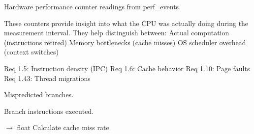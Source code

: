 \documentclass[letterpaper,10pt,english]{sphinxmanual}
\begin{document}
\begin{fulllineitems}
\sphinxAtStartPar
Hardware performance counter readings from perf\_events.

\sphinxAtStartPar
These counters provide insight into what the CPU was actually doing
during the measurement interval. They help distinguish between:
\sphinxhyphen{} Actual computation (instructions retired)
\sphinxhyphen{} Memory bottlenecks (cache misses)
\sphinxhyphen{} OS scheduler overhead (context switches)

\sphinxAtStartPar
Req 1.5: Instruction density (IPC)
Req 1.6: Cache behavior
Req 1.10: Page faults
Req 1.43: Thread migrations

\begin{fulllineitems}
\label{\detokenize{core.models.energy_measurement:core.models.energy_measurement.PerformanceCounters.branch_misses}}
\pysigstartsignatures
\pysigline
{}
\pysigstopsignatures
\sphinxAtStartPar
Mispredicted branches.

\end{fulllineitems}


\begin{fulllineitems}
\label{\detokenize{core.models.energy_measurement:core.models.energy_measurement.PerformanceCounters.branches}}
\pysigstartsignatures
\pysigline
{}
\pysigstopsignatures
\sphinxAtStartPar
Branch instructions executed.

\end{fulllineitems}


\begin{fulllineitems}
\label{\detokenize{core.models.energy_measurement:core.models.energy_measurement.PerformanceCounters.cache_miss_rate}}
\pysigstartsignatures
\pysiglinewithargsret
{}
{}
{{ $\rightarrow$ float}}
\pysigstopsignatures
\sphinxAtStartPar
Calculate cache miss rate.


\end{fulllineitems}
\end{fulllineitems}
\end{document}
